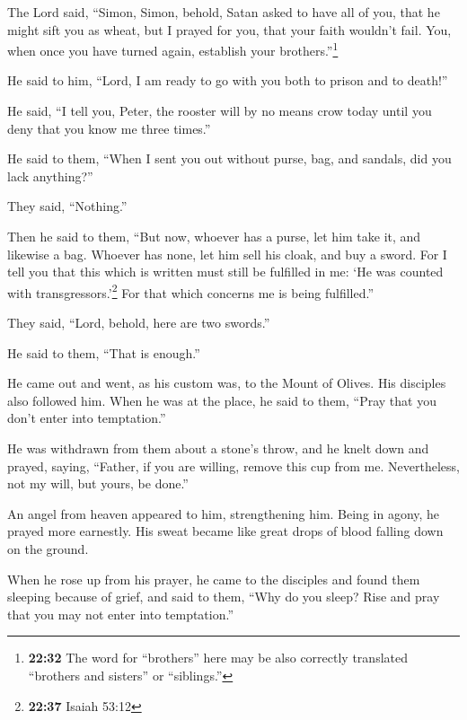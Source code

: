  The Lord said, ``Simon, Simon, behold, Satan asked to
have all of you, that he might sift you as wheat,  but I
prayed for you, that your faith wouldn't fail. You, when once you have
turned again, establish your brothers.''\footnote{\textbf{22:32} The
  word for ``brothers'' here may be also correctly translated ``brothers
  and sisters'' or ``siblings.''}

 He said to him, ``Lord, I am ready to go with you both
to prison and to death!''

 He said, ``I tell you, Peter, the rooster will by no
means crow today until you deny that you know me three times.''

 He said to them, ``When I sent you out without purse,
bag, and sandals, did you lack anything?''

They said, ``Nothing.''

 Then he said to them, ``But now, whoever has a purse,
let him take it, and likewise a bag. Whoever has none, let him sell his
cloak, and buy a sword.  For I tell you that this which
is written must still be fulfilled in me: `He was counted with
transgressors.'\footnote{\textbf{22:37} Isaiah 53:12} For that which
concerns me is being fulfilled.''

 They said, ``Lord, behold, here are two swords.''

He said to them, ``That is enough.''

 He came out and went, as his custom was, to the Mount of
Olives. His disciples also followed him.  When he was at
the place, he said to them, ``Pray that you don't enter into
temptation.''

 He was withdrawn from them about a stone's throw, and he
knelt down and prayed,  saying, ``Father, if you are
willing, remove this cup from me. Nevertheless, not my will, but yours,
be done.''

 An angel from heaven appeared to him, strengthening him.
 Being in agony, he prayed more earnestly. His sweat
became like great drops of blood falling down on the ground.

 When he rose up from his prayer, he came to the
disciples and found them sleeping because of grief,  and
said to them, ``Why do you sleep? Rise and pray that you may not enter
into temptation.''

